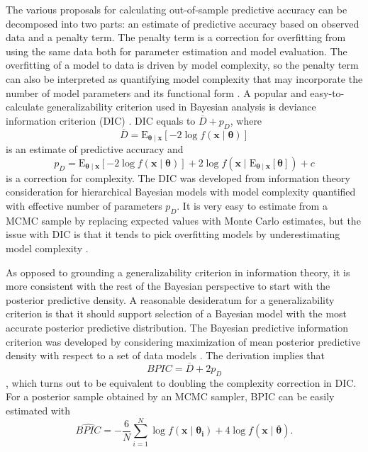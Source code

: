 \documentclass[12pt]{report}
\begin{document}
The various proposals for calculating out-of-sample predictive
accuracy can be decomposed into two parts: an estimate of predictive
accuracy based on observed data and a penalty term. The penalty term
is a correction for overfitting from using the same data both
for parameter estimation and model evaluation. The overfitting of a model to
data is driven by model complexity, so the penalty term can also be interpreted as quantifying
model complexity that may incorporate the number of model parameters and its functional form \citep{MyuKar2008,GelHwa2013}. A popular and easy-to-calculate generalizability
criterion used in Bayesian analysis is deviance information criterion (DIC) \citep{SpiBes2002}. DIC equals to $\overline D + p_D$,
where
%
\begin{equation}
\overline D = \operatorname{E_{\boldsymbol{\theta} \mid \boldsymbol{x}}}[-2\log f(\boldsymbol{x} \mid \boldsymbol{\theta})]
\end{equation}
%
is an estimate of predictive accuracy and 
%
\begin{equation}
p_D = \operatorname{E_{\boldsymbol{\theta} \mid \boldsymbol{x}}}[-2\operatorname{log}f(\boldsymbol{x} \mid \boldsymbol{\theta})] + 2\operatorname{log}f(\boldsymbol{x} \mid \operatorname{E_{\boldsymbol{\theta} \mid \boldsymbol{x}}}[\boldsymbol{\theta}]) + c
\end{equation}
%
is a correction for complexity.  The DIC was developed from information theory consideration for
hierarchical Bayesian models with model complexity quantified with
effective number of parameters $p_D$. It is very easy to estimate from a MCMC sample by replacing expected values with Monte Carlo estimates, but the issue with DIC is that it
tends to pick overfitting models by underestimating model complexity \citep{GelHwa2013}. 

As opposed to grounding a generalizability criterion in information theory, it is more consistent with the rest of the Bayesian perspective to start with the posterior predictive density. A reasonable desideratum for a generalizability
criterion is that it should support selection of a Bayesian model with the most accurate posterior predictive distribution. The
Bayesian predictive information criterion was developed by considering maximization of mean posterior predictive density with respect to a set of data models  \citet{Ano2007,Ano2011}. The derivation implies that
% 
\begin{equation} BPIC = \overline D + 2p_D \end{equation}, 
% 
which turns out to be equivalent to doubling the
complexity correction in DIC. For a posterior sample obtained by an MCMC sampler,
BPIC can be easily estimated with
%
\begin{equation}
\widehat{BPIC} = -\frac{6}{N}\sum_{i=1}^N \operatorname{log}f(\boldsymbol{x} \mid \boldsymbol{\theta_i}) + 4\operatorname{log}f(\boldsymbol{x} \mid  \boldsymbol{\overline\theta}).
\end{equation}
 
\end{document}
